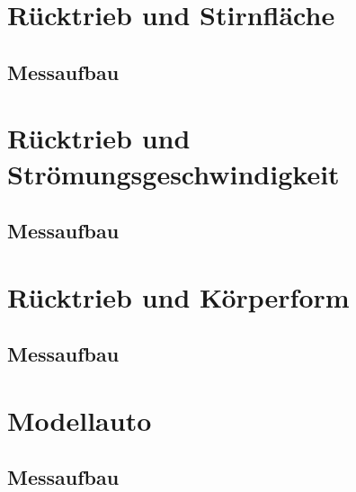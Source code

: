 \section{Rücktrieb und Stirnfläche}
\subsection{Messaufbau}

\section{Rücktrieb und Strömungsgeschwindigkeit}
\subsection{Messaufbau}

\section{Rücktrieb und Körperform}
\subsection{Messaufbau}

\section{Modellauto}
\subsection{Messaufbau}